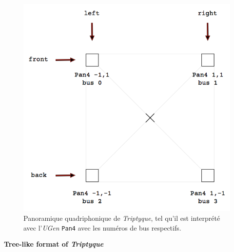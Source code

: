  \begin{figure}[H]
\begin{center}
\includegraphics[scale=0.5]{img/6643}
\caption{Panoramique quadriphonique de \textit{Triptyque}, tel qu'il est interpr\'et\'e avec l'\textit{UGen} \texttt{Pan4} avec les num\'eros de bus respectifs. }
\label{pan}
\end{center}
\end{figure}

\newpage

\noindent \textbf{{\large Tree-like format of \textit{Triptyque}}}
\hrulefill

